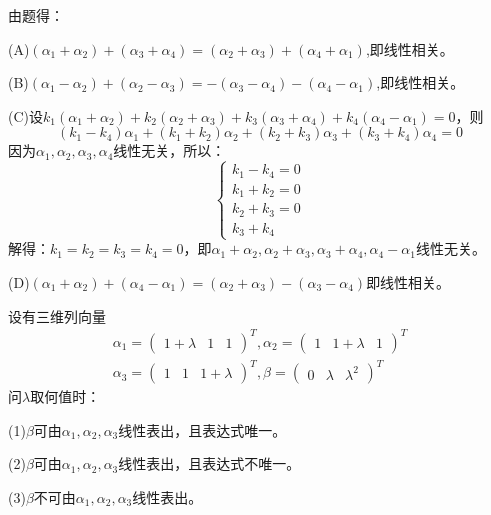 \documentclass[a4paper]{report}
\begin{document}
\begin{jie}

由题得：

(A)$(\alpha_1+\alpha_2)+ (\alpha_3+\alpha_4)=(\alpha_2+\alpha_3)+(\alpha_4+\alpha_1)$,即线性相关。

(B)$(\alpha_1-\alpha_2)+ (\alpha_2-\alpha_3) =-(\alpha_3-\alpha_4)-(\alpha_4-\alpha_1)$,即线性相关。

(C)设$k_1(\alpha_1+\alpha_2)+k_2(\alpha_2+\alpha_3)+k_3(\alpha_3+\alpha_4)+k_4(\alpha_4-\alpha_1)=0$，则
\begin{equation*}
  (k_1-k_4)\alpha_1+(k_1+k_2)\alpha_2+(k_2+k_3)\alpha_3+(k_3+k_4)\alpha_4=0
\end{equation*}
因为$\alpha_1,\alpha_2,\alpha_3,\alpha_4$线性无关，所以：
\begin{equation*}
\begin{cases}
k_1-k_4=0\\
k_1+k_2=0\\
k_2+k_3=0\\
k_3+k_4
\end{cases}
\end{equation*}
解得：$k_1=k_2=k_3=k_4=0$，即$\alpha_1+\alpha_2,\alpha_2+\alpha_3,\alpha_3+\alpha_4,\alpha_4-\alpha_1$线性无关。

(D)$(\alpha_1+\alpha_2)+(\alpha_4-\alpha_1)=(\alpha_2+\alpha_3)-(\alpha_3-\alpha_4)$即线性相关。
\end{jie}

\EX 设有三维列向量
\begin{gather*}
\alpha_1=
\begin{pmatrix}
1+\lambda&1&1
\end{pmatrix}^T,\alpha_2=
\begin{pmatrix}
1&1+\lambda&1
\end{pmatrix}^T\\
\alpha_3=
\begin{pmatrix}
1&1&1+\lambda
\end{pmatrix}^T,\beta=
\begin{pmatrix}
0&\lambda&\lambda^2
\end{pmatrix}^T
\end{gather*}
问$\lambda$取何值时：

(1)$\beta$可由$\alpha_1,\alpha_2,\alpha_3$线性表出，且表达式唯一。

(2)$\beta$可由$\alpha_1,\alpha_2,\alpha_3$线性表出，且表达式不唯一。

(3)$\beta$不可由$\alpha_1,\alpha_2,\alpha_3$线性表出。
\end{document}
